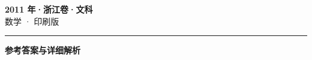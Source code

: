 \documentclass[zihao=5, a4paper]{ctexart}
\begin{document}
\begin{center}
  {\Large\bfseries 2011 年·浙江卷·文科}\\[4pt]
  {\large 数学 · 印刷版}
\end{center}
\medskip
{}

\par\bigskip\hrule\bigskip
{}
\begin{center}{\large\bfseries 参考答案与详细解析}\end{center}
\smallskip

\end{document}

